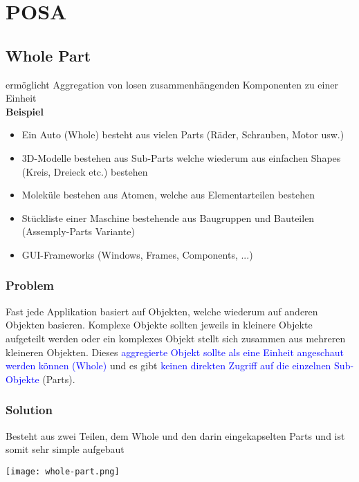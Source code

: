 \section{POSA}

\subsection{Whole Part}

ermöglicht Aggregation von losen zusammenhängenden Komponenten zu einer Einheit \\

\textbf{Beispiel}

\begin{itemize}
    \item Ein Auto (Whole) besteht aus vielen Parts (Räder, Schrauben, Motor usw.)
    \item 3D-Modelle bestehen aus Sub-Parts welche wiederum aus einfachen Shapes (Kreis, Dreieck etc.) bestehen
    \item Moleküle bestehen aus Atomen, welche aus Elementarteilen bestehen
    \item Stückliste einer Maschine bestehende aus Baugruppen und Bauteilen (Assemply-Parts Variante)
    \item GUI-Frameworks (Windows, Frames, Components, ...)
\end{itemize}

\subsubsection{Problem}

Fast jede Applikation basiert auf Objekten, welche wiederum auf anderen Objekten basieren. Komplexe Objekte sollten jeweils in kleinere Objekte aufgeteilt werden oder ein komplexes Objekt stellt sich zusammen aus mehreren kleineren Objekten. Dieses \textcolor{blue}{aggregierte Objekt sollte als eine Einheit angeschaut werden können (Whole)} und es gibt \textcolor{blue}{keinen direkten Zugriff auf die einzelnen Sub-Objekte} (Parts).

\subsubsection{Solution}

Besteht aus zwei Teilen, dem Whole und den darin eingekapselten Parts und ist somit sehr simple aufgebaut

\texttt{[image: whole-part.png]}

